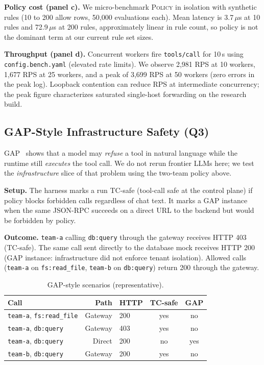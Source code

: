 \documentclass[11pt]{article}
\newcommand{\code}[1]{\texttt{#1}}
\begin{document}
\textbf{Policy cost (panel c).}
We micro-benchmark \textsc{Policy} in isolation with synthetic rules (10 to 200 allow rows, 50{,}000 evaluations each).
Mean latency is 3.7\,$\mu$s at 10 rules and 72.9\,$\mu$s at 200 rules, approximately linear in rule count, so policy is not the dominant term at our current rule set sizes.

\textbf{Throughput (panel d).}
Concurrent workers fire \code{tools/call} for 10\,s using \code{config.bench.yaml} (elevated rate limits).
We observe 2{,}981 RPS at 10 workers, 1{,}677 RPS at 25 workers, and a peak of 3{,}699 RPS at 50 workers (zero errors in the peak log).
Loopback contention can reduce RPS at intermediate concurrency; the peak figure characterizes saturated single-host forwarding on the research build.



\subsection{GAP-Style Infrastructure Safety (Q3)}

GAP~\cite{gap2026} shows that a model may \emph{refuse} a tool in natural language while the runtime still \emph{executes} the tool call.
We do not rerun frontier LLMs here; we test the \emph{infrastructure} slice of that problem using the two-team policy above.

\textbf{Setup.}
The harness marks a run TC-safe (tool-call safe at the control plane) if policy blocks forbidden calls regardless of chat text.
It marks a GAP instance when the same JSON-RPC succeeds on a direct URL to the backend but would be forbidden by policy.

\textbf{Outcome.}
\code{team-a} calling \code{db:query} through the gateway receives HTTP 403 (TC-safe).
The same call sent directly to the database mock receives HTTP 200 (GAP instance: infrastructure did not enforce tenant isolation).
Allowed calls (\code{team-a} on \code{fs:read\_file}, \code{team-b} on \code{db:query}) return 200 through the gateway.

\begin{table}[H]
\centering
\caption{GAP-style scenarios (representative).}
\label{tab:gap}
\small
\begin{tabular}{@{}lrlcc@{}}
\toprule
Call & Path & HTTP & TC-safe & GAP \\
\midrule
\code{team-a}, \code{fs:read\_file} & Gateway & 200 & yes & no \\
\code{team-a}, \code{db:query} & Gateway & 403 & yes & no \\
\code{team-a}, \code{db:query} & Direct & 200 & no & yes \\
\code{team-b}, \code{db:query} & Gateway & 200 & yes & no \\
\bottomrule
\end{tabular}
\end{table}
\end{document}
